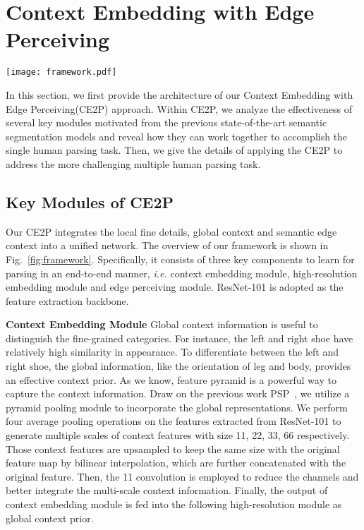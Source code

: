 \documentclass[letterpaper]{article} \usepackage{formatting-instructions-latex-2019}  \usepackage{times}  \usepackage{helvet}  \usepackage{courier}  \usepackage{url}  \usepackage{graphicx}  \frenchspacing  \setlength{\pdfpagewidth}{8.5in}  \setlength{\pdfpageheight}{11in}
\newcommand{\ie}{\emph{i.e. }}
\begin{document}
\section{Context Embedding with Edge Perceiving}

\begin{figure*}[!htb]
    \centering
    \texttt{[image: framework.pdf]}
    \caption{The framework of our proposed CE2P. The overall architecture consists of three key modules: 1) high resolution embedding module 2) global context embedding module; 3) edge perceiving module.  }
    \label{fig:framework}
\end{figure*}

In this section, we first provide the architecture of our Context Embedding with Edge Perceiving(CE2P) approach. Within CE2P, we analyze the effectiveness of several key modules motivated from the previous state-of-the-art semantic segmentation models and reveal how they can work together to accomplish the single human parsing task. Then, we give the details of applying the CE2P to address the more challenging multiple human parsing task.



\subsection{Key Modules of CE2P} 
Our CE2P integrates the local fine details, global context and semantic edge context into a unified network. The overview of our framework is shown in Fig.~\ref{fig:framework}. Specifically, it consists of three key components to learn for parsing in an end-to-end manner, \ie context embedding module, high-resolution embedding module and edge perceiving module. ResNet-101 is adopted as the feature extraction backbone. 

\noindent \textbf{Context Embedding Module}
Global context information is useful to distinguish the fine-grained categories. For instance, the left and right shoe have relatively high similarity in appearance. To differentiate between the left and right shoe, the global information, like the orientation of leg and body, provides an effective context prior. As we know, feature pyramid is a powerful way to capture the context information. Draw on the previous work PSP~\cite{Zhao2017}, we utilize a pyramid pooling module to incorporate the global representations. We perform four average pooling operations on the features extracted from ResNet-101 to generate multiple scales of context features with size 11, 22, 33, 66 respectively. Those context features are upsampled to keep the same size with the original feature map by bilinear interpolation, which are further concatenated with the original feature. Then, the 11 convolution is employed to reduce the channels and better integrate the multi-scale context information. Finally, the output of context embedding module is fed into the following high-resolution module as global context prior.  
\end{document}
